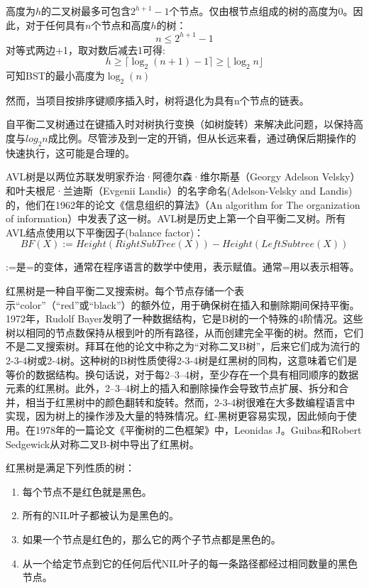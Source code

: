 高度为$h$的二叉树最多可包含$2^{h+1}-1$个节点。仅由根节点组成的树的高度为0。因此，对于任何具有$n$个节点和高度$h$的树：
$$n \leq 2^{h+1}-1$$
对等式两边+1，取对数后减去1可得:
$$h \geq \lceil \log _{2}(n+1)-1\rceil \geq \lfloor \log _{2}n\rfloor$$
可知BST的最小高度为$\log_{2}(n)$

然而，当项目按排序键顺序插入时，树将退化为具有n个节点的链表。

自平衡二叉树通过在键插入时对树执行变换（如树旋转）来解决此问题，以保持高度与$log_2{n}$成比例。尽管涉及到一定的开销，但从长远来看，通过确保后期操作的快速执行，这可能是合理的。

AVL树\cite{enwiki:1026867024}是以两位苏联发明家乔治·阿德尔森·维尔斯基（Georgy Adelson Velsky）和叶夫根尼·兰迪斯（Evgenii Landis）的名字命名(Adelson-Velsky and Landis)的，他们在1962年的论文《信息组织的算法》（An algorithm for The organization of information）中发表了这一树。AVL树是历史上第一个自平衡二叉树。所有AVL结点使用以下平衡因子(balance factor)：
$$BF(X):=Height(RightSubTree(X))-Height(LeftSubtree(X))$$

:=是=的变体，通常在程序语言的数学中使用，表示赋值。通常=用以表示相等。

红黑树是一种自平衡二叉搜索树。每个节点存储一个表示“color”（“red”或“black”）的额外位，用于确保树在插入和删除期间保持平衡。1972年，Rudolf Bayer发明了一种数据结构，它是B树的一个特殊的4阶情况。这些树以相同的节点数保持从根到叶的所有路径，从而创建完全平衡的树。然而，它们不是二叉搜索树。拜耳在他的论文中称之为“对称二叉B树”，后来它们成为流行的2-3-4树或2-4树。这种树的B树性质使得2-3-4树是红黑树的同构，这意味着它们是等价的数据结构。换句话说，对于每2–3–4树，至少存在一个具有相同顺序的数据元素的红黑树。此外，2–3–4树上的插入和删除操作会导致节点扩展、拆分和合并，相当于红黑树中的颜色翻转和旋转。然而，2-3-4树很难在大多数编程语言中实现，因为树上的操作涉及大量的特殊情况。红-黑树更容易实现，因此倾向于使用。在1978年的一篇论文《平衡树的二色框架》中，Leonidas J。Guibas和Robert Sedgewick从对称二叉B-树中导出了红黑树\cite{enwiki:1027677404}。

红黑树是满足下列性质的树：

\begin{enumerate}
	\item 每个节点不是红色就是黑色。
	\item 所有的NIL叶子都被认为是黑色的。
	\item 如果一个节点是红色的，那么它的两个子节点都是黑色的。
	\item 从一个给定节点到它的任何后代NIL叶子的每一条路径都经过相同数量的黑色节点。
\end{enumerate}



